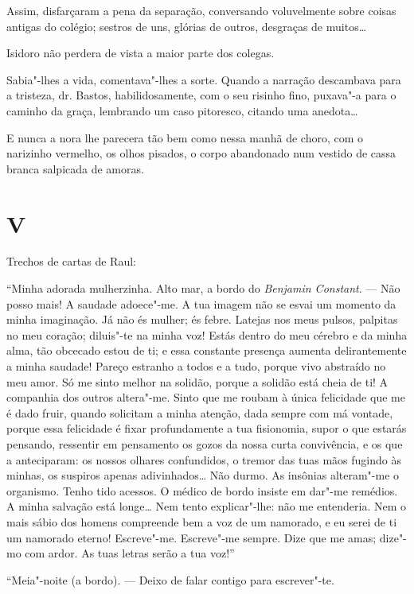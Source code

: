 Assim, disfarçaram a pena da separação, conversando voluvelmente sobre
coisas antigas do colégio; sestros de uns, glórias de outros, desgraças
de muitos\ldots{}

Isidoro não perdera de vista a maior parte dos colegas.

Sabia"-lhes a vida, comentava"-lhes a sorte. Quando a narração descambava
para a tristeza, dr. Bastos, habilidosamente, com o seu risinho fino,
puxava"-a para o caminho da graça, lembrando um caso pitoresco, citando
uma anedota\ldots{}

E nunca a nora lhe parecera tão bem como nessa manhã de choro, com o
narizinho vermelho, os olhos pisados, o corpo abandonado num vestido de
cassa branca salpicada de amoras.

\section{V}

Trechos de cartas de Raul:

``Minha adorada mulherzinha. Alto mar, a bordo do \emph{Benjamin
Constant}. --- Não posso mais! A saudade adoece"-me. A tua imagem não se
esvai um momento da minha imaginação. Já não és mulher; és febre.
Latejas nos meus pulsos, palpitas no meu coração; diluis"-te na minha
voz! Estás dentro do meu cérebro e da minha alma, tão obcecado estou de
ti; e essa constante presença aumenta delirantemente a minha saudade!
Pareço estranho a todos e a tudo, porque vivo abstraído no meu amor. Só
me sinto melhor na solidão, porque a solidão está cheia de ti! A
companhia dos outros altera"-me. Sinto que me roubam à única felicidade
que me é dado fruir, quando solicitam a minha atenção, dada sempre com
má vontade, porque essa felicidade é fixar profundamente a tua
fisionomia, supor o que estarás pensando, ressentir em pensamento os
gozos da nossa curta convivência, e os que a anteciparam: os nossos
olhares confundidos, o tremor das tuas mãos fugindo às minhas, os
suspiros apenas adivinhados\ldots{} Não durmo. As insônias alteram"-me o
organismo. Tenho tido acessos. O médico de bordo insiste em dar"-me
remédios. A minha salvação está longe\ldots{} Nem tento explicar"-lhe: não me
entenderia. Nem o mais sábio dos homens compreende bem a voz de um
namorado, e eu serei de ti um namorado eterno! Escreve"-me. Escreve"-me
sempre. Dize que me amas; dize"-mo com ardor. As tuas letras serão a tua
voz!''

\dotfill{}

``Meia"-noite (a bordo). --- Deixo de falar contigo para escrever"-te.

